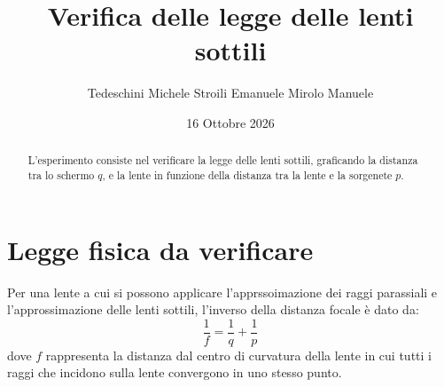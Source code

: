 \documentclass[10pt,twocolumn]{article}
\begin{document}
    \justifying 

      \title{\textbf{Verifica delle legge delle lenti sottili}}
      \author{Tedeschini Michele \hspace{0.7cm} Stroili Emanuele \hspace{0.7cm} Mirolo Manuele}
      \date{16 Ottobre 2026}
      \maketitle
      \onecolumn
      \tableofcontents
    \vspace{3cm}
      \begin{abstract}
        \centering
        \large
        L'esperimento consiste nel verificare la legge delle lenti sottili, graficando la distanza tra lo schermo $q$, e la lente in funzione della distanza tra la lente e la sorgenete $p$. 
          
      \end{abstract}

      \newpage
    \restoregeometry
    \twocolumn



    \section{Legge fisica da verificare}
    Per una lente a cui si possono applicare l'apprssoimazione dei raggi parassiali e l'approssimazione delle lenti sottili, l'inverso della distanza focale è dato da:
    \[
    \frac{1}{f}=\frac{1}{q}+\frac{1}{p}
    \] 
    dove $f$ rappresenta la distanza dal centro di curvatura della lente in cui tutti i raggi che incidono sulla lente convergono in uno stesso punto.
\end{document}

